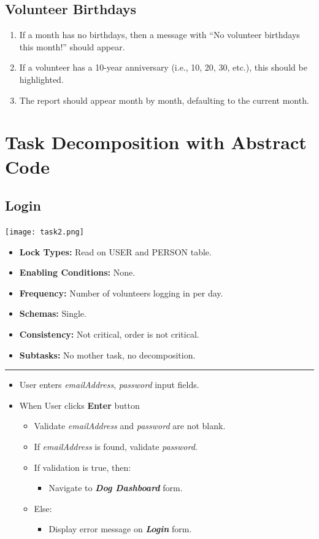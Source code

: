 \documentclass{article}
\begin{document}
\subsection{Volunteer Birthdays}
\begin{enumerate}
    \item If a month has no birthdays, then a message with “No volunteer birthdays this month!” should appear.
    \item If a volunteer has a 10-year anniversary (i.e., 10, 20, 30, etc.), this should be highlighted.
    \item The report should appear month by month, defaulting to the current month.
\end{enumerate}

\newpage
\section{Task Decomposition with Abstract Code}

\subsection{Login}
\begin{center}
    \texttt{[image: task2.png]}
\end{center}
\begin{itemize}
    \item \textbf{Lock Types:} Read on USER and PERSON table.
    \item \textbf{Enabling Conditions:} None.
    \item \textbf{Frequency:} Number of volunteers logging in per day.
    \item \textbf{Schemas:} Single.
    \item \textbf{Consistency:} Not critical, order is not critical.
    \item \textbf{Subtasks:} No mother task, no decomposition.
\end{itemize}
\noindent\rule{8cm}{0.4pt}
\begin{itemize}
    \item User enters \textit{emailAddress}, \textit{password} input fields.
    \item When User clicks \textbf{Enter} button
    \begin{itemize}
        \item Validate \textit{emailAddress} and \textit{password} are not blank.
        \item If \textit{emailAddress} is found, validate \textit{password}.
        \item If validation is true, then:
        \begin{itemize}
            \item Navigate to \textbf{\textit{Dog Dashboard}} form.
        \end{itemize}
        \item Else:
        \begin{itemize}
            \item Display error message on \textbf{\textit{Login}} form.
        \end{itemize}
    \end{itemize}
\end{itemize}
\end{document}
